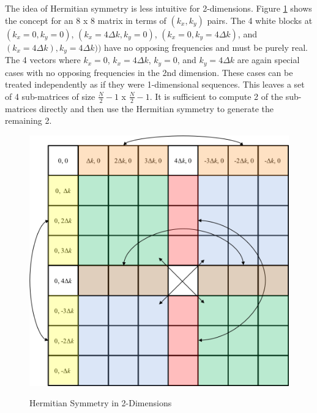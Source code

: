 The idea of Hermitian symmetry is less intuitive for 2-dimensions. Figure \ref{os_fig:7dd} shows the concept for an 8 x 8 matrix in terms of $(k_x, k_y)$ pairs. The 4 white blocks at $(k_x=0, k_y=0)$, $(k_x=4\Delta k, k_y=0)$, $(k_x=0, k_y=4\Delta k)$, and $(k_x=4\Delta k), k_y=4\Delta k))$ have no opposing frequencies and must be purely real. The 4 vectors where $k_x = 0$, $k_x = 4\Delta k$, $k_y = 0$, and $k_y = 4\Delta k$ are again special cases with no opposing frequencies in the 2nd dimension. These cases can be treated independently as if they were 1-dimensional sequences. This leaves a set of 4 sub-matrices of size $\frac{N}{2} - 1 $ x $\frac{N}{2} - 1$. It is sufficient to compute 2 of the sub-matrices directly and then use the Hermitian symmetry to generate the remaining 2.
\begin{figure}[H]
  \begin{center}
\includegraphics[width=6in]{../media/Ocean_Surface/2-d_hermitian_symmetry.png}
  \end{center}
  \renewcommand{\baselinestretch}{1} \small\normalsize
  \begin{quote}
    \caption[Hermitian Symmetry in 2-Dimensions]{Hermitian Symmetry in 2-Dimensions \label{os_fig:7dd}}
  \end{quote}
\end{figure}
\renewcommand{\baselinestretch}{2} \small\normalsize

